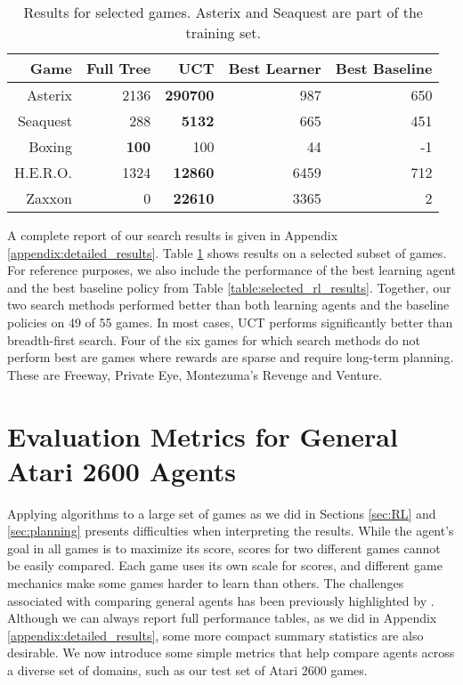 \documentclass[twoside,11pt]{article}
\newcommand{\gamename}[1]{{\sc #1}}
\begin{document}
\begin{table}
\small
\begin{center}
\clearpage{}\begin{tabular}{|r|r|r|r|r|}
\hline
Game & Full Tree & UCT & Best Learner & Best Baseline \\ 
\hline
\hline
\gamename{Asterix} & 2136& \textbf { 290700 }& 987& 650\\
\hline
\gamename{Seaquest} & 288& \textbf { 5132 }& 665& 451\\
\hline
\gamename{Boxing} & \textbf { 100 }& 100& 44& -1\\
\hline
\gamename{H.E.R.O.} & 1324& \textbf { 12860 }& 6459& 712\\
\hline
\gamename{Zaxxon} & 0& \textbf { 22610 }& 3365& 2\\
\hline
\end{tabular}
\clearpage{}
\end{center}
\vspace{-1.6em}
\caption{Results for selected games. \gamename{Asterix} and \gamename{Seaquest} are part of the training set.\label{table:selected_search_results}}
\end{table}


A complete report of our search results is given in Appendix \ref{appendix:detailed_results}.
Table \ref{table:selected_search_results} shows results on a selected subset of games.
For reference purposes, we also include the performance of the best learning agent and the best 
baseline policy from Table \ref{table:selected_rl_results}.
Together, our two search methods performed better than both learning agents and the baseline policies on 49 of 55 games. In most cases, UCT performs significantly better than breadth-first search.
Four of the six games for which search methods do not perform best are games where rewards are sparse and require long-term planning. These are \gamename{Freeway}, \gamename{Private Eye}, \gamename{Montezuma's Revenge} and \gamename{Venture}. 

\section{Evaluation Metrics for General Atari 2600 Agents}
\label{sec:comparison}

Applying algorithms to a large set of games as we did in Sections \ref{sec:RL} and 
\ref{sec:planning} presents difficulties when interpreting the results.
While the agent's goal in all games is to maximize its score, scores for two different games cannot be easily compared. 
Each game uses its own scale for scores, and different game mechanics make some games harder to learn than others. 
The challenges associated with comparing general agents has been previously highlighted by .
Although we can always report full performance tables, as we did in Appendix \ref{appendix:detailed_results}, some more compact summary statistics are also desirable.
We now introduce some simple metrics that help compare agents across a diverse set of domains, such as our test set of Atari 2600 games.
\end{document}
